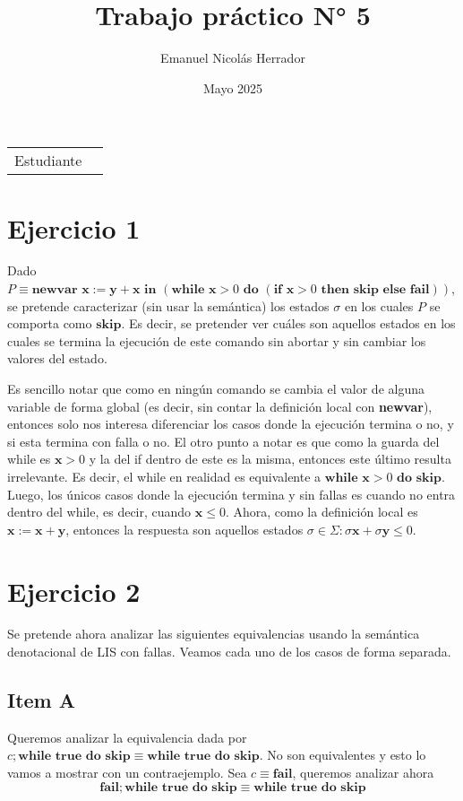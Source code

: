 \documentclass{article}
\title{Trabajo práctico N° 5}
\author{Emanuel Nicolás Herrador}
\date{Mayo 2025}
\newcommand{\x}{\textbf{x}}
\newcommand{\y}{\textbf{y}}
\newcommand{\ctrue}{\textbf{true}}
\newcommand{\cskip}{\textbf{skip}}
\newcommand{\cif}[3]{\textbf{if }#1\textbf{ then }#2\textbf{ else }#3}
\newcommand{\cnewvar}[3]{\textbf{newvar }#1 := #2\textbf{ in }#3}
\newcommand{\cwhile}[2]{\textbf{while }#1\textbf{ do }#2}
\newcommand{\cfail}{\textbf{fail}}
\begin{document}
\maketitle

\noindent\begin{tabular}{@{}ll}
	Estudiante & \theauthor \\
\end{tabular}

\section*{Ejercicio 1}
Dado $P \equiv \cnewvar{\x}{\y+\x}{(\cwhile{\x>0}{(\cif{\x>0}{\cskip}{\cfail})})}$, se pretende caracterizar (sin usar la semántica) los estados $\sigma$ en los cuales $P$ se comporta como $\cskip$.
Es decir, se pretender ver cuáles son aquellos estados en los cuales se termina la ejecución de este comando sin abortar y sin cambiar los valores del estado.

Es sencillo notar que como en ningún comando se cambia el valor de alguna variable de forma global (es decir, sin contar la definición local con \textbf{newvar}), entonces solo nos interesa diferenciar los casos donde la ejecución termina o no, y si esta termina con falla o no.
El otro punto a notar es que como la guarda del while es $\x > 0$ y la del if dentro de este es la misma, entonces este último resulta irrelevante.
Es decir, el while en realidad es equivalente a $\cwhile{\x > 0}{\cskip}$.
Luego, los únicos casos donde la ejecución termina y sin fallas es cuando no entra dentro del while, es decir, cuando $\x \leq 0$.
Ahora, como la definición local es $\x := \x+\y$, entonces la respuesta son aquellos estados $\sigma \in \Sigma : \sigma\x + \sigma\y \leq 0$.

\section*{Ejercicio 2}
Se pretende ahora analizar las siguientes equivalencias usando la semántica denotacional de LIS con fallas.
Veamos cada uno de los casos de forma separada.

\subsection*{Item A}
Queremos analizar la equivalencia dada por $c; \cwhile{\ctrue}{\cskip} \equiv \cwhile{\ctrue}{\cskip}$.
No son equivalentes y esto lo vamos a mostrar con un contraejemplo.
Sea $c \equiv \cfail$, queremos analizar ahora
\begin{equation*}
  \cfail; \cwhile{\ctrue}{\cskip} \equiv \cwhile{\ctrue}{\cskip}
\end{equation*}
\end{document}
